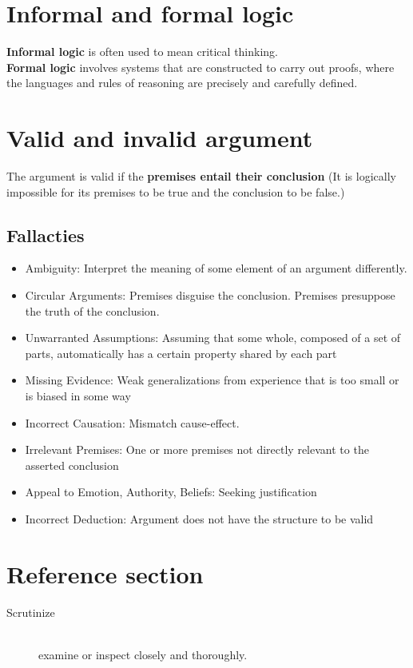 \documentclass{article}
\begin{document}
\section{Informal and formal logic}
\begin{flushleft}
\textbf{Informal logic} is often used to mean critical thinking. \\
\textbf{Formal logic} involves systems that are constructed to carry out proofs, where the languages and rules of reasoning are precisely and carefully defined.
\end{flushleft}

\section{Valid and invalid argument}
\begin{flushleft}
The argument is valid if the \textbf{premises entail their conclusion} (It is logically impossible for its premises to be true and the conclusion to be false.)
\end{flushleft}

\subsection{Fallacties}
\begin{itemize}
  \item Ambiguity: Interpret the meaning of some element of an argument differently.
  \item Circular Arguments: Premises disguise the conclusion. Premises presuppose the truth of the conclusion.
  \item Unwarranted Assumptions: Assuming that some whole, composed of a set of parts, automatically has a certain property shared by each part
  \item Missing Evidence: Weak generalizations from experience that is too small or is biased in some way
  \item Incorrect Causation: Mismatch cause-effect.
  \item Irrelevant Premises: One or more premises not directly relevant to the asserted conclusion
  \item Appeal to Emotion, Authority, Beliefs: Seeking justification
  \item Incorrect Deduction: Argument does not have the structure to be valid
\end{itemize}

\pagebreak
\section*{Reference section} \label{sec:reference}
\begin{description}
	\item[Scrutinize] \hfill \\ examine or inspect closely and thoroughly.
\end{description}
\end{document}
